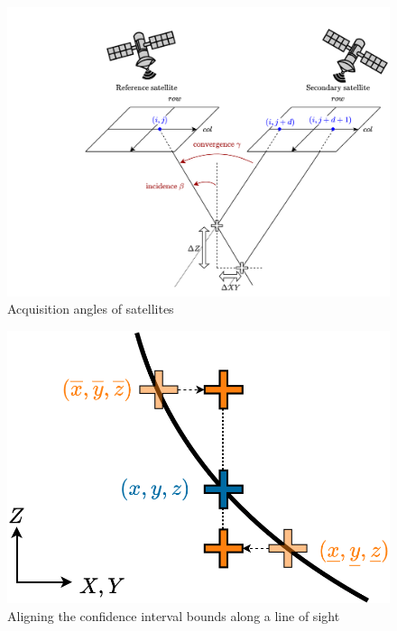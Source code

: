 \begin{figure}
    \centering
    \includegraphics[width=0.8\linewidth]{Images/Chap_5/Incidence_angle.png}
    \caption{Acquisition angles of satellites}
    \label{fig:incidence_angle}
\end{figure}

\begin{figure}
    \centering
    \includegraphics[width=0.6\linewidth]{Images/Chap_5/Planimetric_shift.png}
    \caption{Aligning the confidence interval bounds along a line of sight}
    \label{fig:planimetric_shift}
\end{figure}


